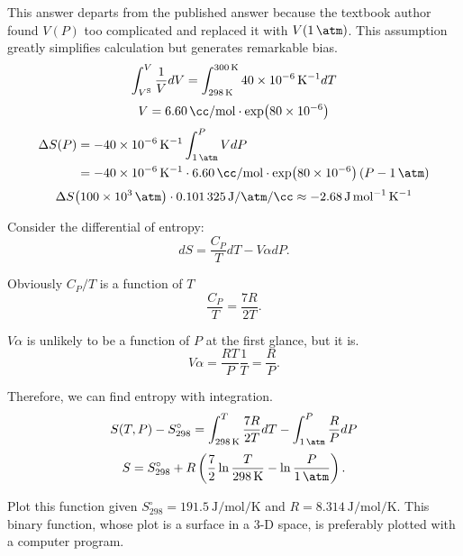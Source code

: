 \begin{@empty}
\begin{answer}
\begin{enumerate}
\begin{@empty}
                This answer departs from the published answer because the textbook author
                found $V(P)$ too complicated and replaced it with $V(\SI{1}{\atm})$.
                This assumption greatly simplifies calculation but generates remarkable
                bias.
                \[
                    \int_{V^{\text S}}^V \frac1V dV
                    = \int_{\SI{298}{\kelvin}}^{\SI{300}{\kelvin}} \SI{40e-6}{\per\kelvin} dT
                \]
                \[
                    V = \thisVS \cdot \exp \Left( \num{80e-6} \Right)
                \]
                \begin{align*}
                    \Delta S(P) &= -\thisa \int_{\stdP}^P VdP \\
                    &= -\thisa \cdot \thisVS \cdot \exp \Left( \num{80e-6} \Right)
                        \left( P - \stdP \right)
                \end{align*}
                \[
                    \Delta S \Left( \SI{100e3}{\atm} \Right) \cdot \convert
                    \approx \SI{-2.68}{\joule\per\mol\per\kelvin}
                \]
            \end{@empty}
    \end{enumerate}
\end{answer}

\begin{problem}
\end{problem}

\begin{problem}
\end{problem}

\begin{problem}
\end{problem}

\begin{answer}
    Consider the differential of entropy:
    \[ dS = \frac{C_P}{T} dT - V\alpha dP.\]

    Obviously $C_P / T$ is a function of $T$
    \[ \frac{C_P}{T} = \frac{7R}{2T}.\]

    $V\alpha$ is unlikely to be a function of $P$ at the first glance, but it
    is.
    \[ V\alpha = \frac{RT}{P} \frac{1}{T} = \frac{R}{P}.\]

    Therefore, we can find entropy with integration.
    \[ S(T, P) - S_{298}^\circ = \int_{\SI{298}{\kelvin}}^T \frac{7R}{2T} dT - \int_{\SI{1}{\atm}}^P \frac{R}{P} dP \]
    \[ S = S_{298}^\circ + R \left( \frac72 \ln\frac{T}{\SI{298}{\kelvin}} - \ln\frac{P}{\SI{1}{\atm}} \right).\]

    Plot this function given $S_{298}^\circ = \SI{191.5}{\joule\per\mol\per\kelvin}$
    and $R = \SI{8.314}{\joule\per\mol\per\kelvin}$.  This binary function,
    whose plot is a surface in a 3-D space, is preferably plotted with a
    computer program.
\end{answer}


\end{@empty}
